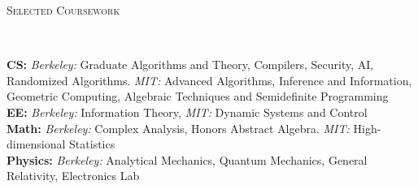\documentclass[9pt]{article}
\newenvironment{changemargin}[2]{%
  \begin{list}{}{%
      \setlength{\topsep}{0pt}%
      \setlength{\leftmargin}{#1}%
      \setlength{\rightmargin}{#2}%
      \setlength{\listparindent}{\parindent}%
      \setlength{\itemindent}{\parindent}%
      \setlength{\parsep}{\parskip}%
    }%
  \item[]}{\end{list}
}
\newcommand{\lineover}{
  \begin{changemargin}{-0.05in}{-0.05in}
    \vspace*{-8pt}
    \hrulefill \\
    \vspace*{-2pt}
  \end{changemargin}
}
\newcommand{\header}[1]{
  \begin{changemargin}{-0.5in}{-0.5in}
    \scshape{#1}\\
    \lineover
  \end{changemargin}
}
\newenvironment{body} {
  \vspace*{-16pt}
  \begin{changemargin}{-0.25in}{-0.5in}
  }
  {\end{changemargin}
}
\begin{document}
\header{Selected Coursework}
\begin{body}
  \vspace{14pt}
  \textbf{CS:} \emph{Berkeley:} Graduate Algorithms and Theory, Compilers, Security, AI, Randomized Algorithms. \emph{MIT:} Advanced Algorithms, Inference and Information, Geometric Computing, Algebraic Techniques and Semidefinite Programming \\
  \smallskip
  \textbf{EE:} \emph{Berkeley:} Information Theory, \emph{MIT:} Dynamic Systems and Control \\
  \smallskip
  \textbf{Math:} \emph{Berkeley:} Complex Analysis, Honors Abstract Algebra. \emph{MIT:} High-dimensional Statistics \\
  \smallskip
  \textbf{Physics:} \emph{Berkeley:} Analytical Mechanics, Quantum Mechanics, General Relativity, Electronics Lab \\
\end{body}
\end{document}
